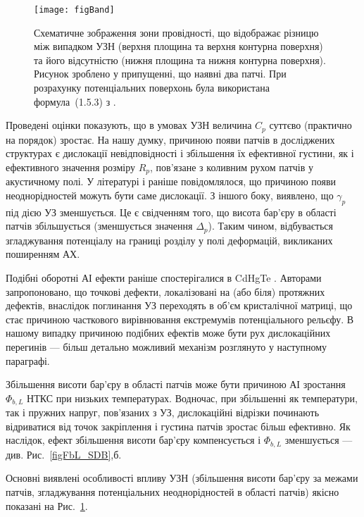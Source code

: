 \documentclass[a4paper,14pt,oneside,openany]{memoir}
\begin{document}
\begin{figure}
\center
\texttt{[image: figBand]}
\caption{\label{figBand}
Схематичне зображення зони провідності,
що відображає різницю між випадком УЗН (верхня площина та верхня контурна поверхня) та
його відсутністю (нижня площина та нижня контурна поверхня).
Рисунок зроблено у припущенні, що наявні два патчі.
При розрахунку потенціальних поверхонь була використана формула~(1.5.3) з \cite{Tung:MSE}.
}%
\end{figure}

Проведені оцінки показують,
що в умовах УЗН величина $C_p$ суттєво (практично на порядок) зростає.
На нашу думку, причиною появи патчів в досліджених структурах є дислокації невідповідності і збільшення їх ефективної густини, як і ефективного значення розміру $R_p$,
пов'язане з коливним рухом патчів у акустичному полі.
У літературі \cite{GELCZUK2014} і раніше повідомлялося, що причиною появи неоднорідностей можуть бути саме дислокації.
З іншого боку, виявлено, що $\gamma_p$ під дією УЗ зменшується.
Це є свідченням того, що висота бар'єру в області патчів збільшується (зменшується значення $\Delta_p$).
Таким чином, відбувається згладжування потенціалу на границі розділу у полі деформацій, викликаних поширенням АХ.

Подібні оборотні АІ ефекти раніше спостерігалися в CdHgTe \cite{Vlasenko2000r}.
Авторами \cite{Vlasenko2000r} запропоновано, що точкові дефекти, локалізовані на (або біля) протяжних дефектів, внаслідок поглинання УЗ переходять в об'єм кристалічної матриці,
що стає причиною часткового вирівнювання екстремумів потенціального рельєфу.
В нашому  випадку причиною подібних ефектів може бути рух дислокаційних перегинів --- більш детально можливий механізм розглянуто у наступному параграфі.

Збільшення висоти бар'єру в області патчів може бути причиною АІ зростання $\Phi_{b,L}$ НТКС при низьких температурах.
Водночас, при збільшенні як температури, так і пружних напруг, пов'язаних з УЗ,
дислокаційні відрізки починають відриватися від точок закріплення
 і густина патчів зростає більш ефективно.
Як наслідок, ефект збільшення висоти бар'єру компенсується і $\Phi_{b,L}$ зменшується --- див. Рис.~\ref{figFbL_SDB},б.


Основні виявлені особливості впливу УЗН (збільшення висоти бар'єру за межами патчів, згладжування потенціальних неоднорідностей в області патчів) якісно показані на Рис.~\ref{figBand}.
\end{document}
